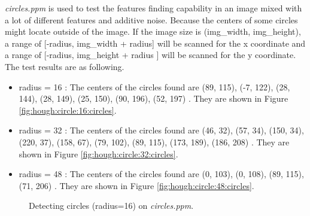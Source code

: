 \documentclass[paper=a4, fontsize=11pt]{scrartcl}
\begin{document}
\emph{circles.ppm} is used to test the features finding capability in an image mixed with a lot of different features and additive noise.
Because the centers of some circles might locate outside of the image.
If the image size is (img\_width, img\_height), a range of [-radius, img\_width + radius] will be scanned for the x coordinate and a range of [-radius, img\_height + radius ] will be scanned for the y coordinate.
The test results are as following.
\begin{itemize}
\item radius = 16 : The centers of the circles found are (89, 115), (-7, 122), (28, 144), (28, 149), (25, 150), (90, 196), (52, 197) .
They are shown in Figure \ref{fig:hough:circle:16:circles}.
\item radius = 32 : The centers of the circles found are (46, 32), (57, 34), (150, 34), (220, 37), (158, 67), (79, 102), (89, 115), (173, 189), (186, 208) .
They are shown in Figure \ref{fig:hough:circle:32:circles}.
\item radius = 48 : The centers of the circles found are  (0, 103), (0, 108), (89, 115), (71, 206) .
They are shown in Figure \ref{fig:hough:circle:48:circles}.
\end{itemize}

\begin{figure}[h]
\centering
{}
\caption{Detecting circles (radius=16) on \emph{circles.ppm}.}
\label{fig:hough:circle:16}
\end{figure}
\end{document}
